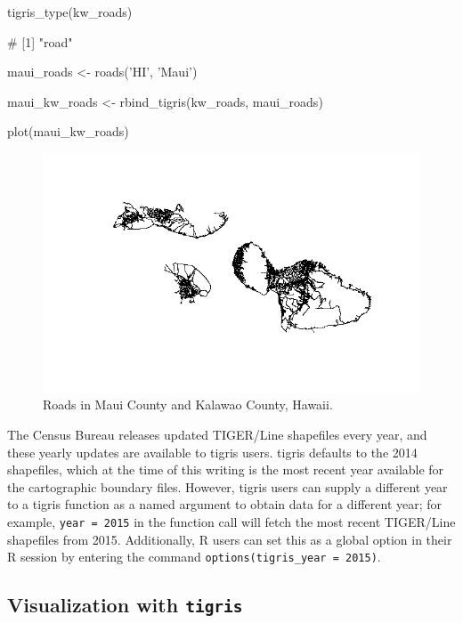 \begin{Schunk}
\begin{Sinput}
tigris_type(kw_roads)

# [1] "road"
\end{Sinput}
\end{Schunk}

\begin{Schunk}
\begin{Sinput}
maui_roads <- roads('HI', 'Maui')

maui_kw_roads <- rbind_tigris(kw_roads, maui_roads)

plot(maui_kw_roads)
\end{Sinput}
\end{Schunk}

\begin{figure}[htbp]
  \centering
  \includegraphics[width=\textwidth]{maui_kw}
  \caption{Roads in Maui County and Kalawao County, Hawaii.}
  \label{figure:maui_kw}
\end{figure}

The Census Bureau releases updated TIGER/Line shapefiles every year, and
these yearly updates are available to tigris users. tigris defaults to
the 2014 shapefiles, which at the time of this writing is the most
recent year available for the cartographic boundary files. However,
tigris users can supply a different year to a tigris function as a named
argument to obtain data for a different year; for example,
\texttt{year\ =\ 2015} in the function call will fetch the most recent
TIGER/Line shapefiles from 2015. Additionally, R users can set this as a
global option in their R session by entering the command
\texttt{options(tigris\_year\ =\ 2015)}.

\subsection{\texorpdfstring{Visualization with
\texttt{tigris}}{Visualization with tigris}}\label{visualization-with-tigris}

